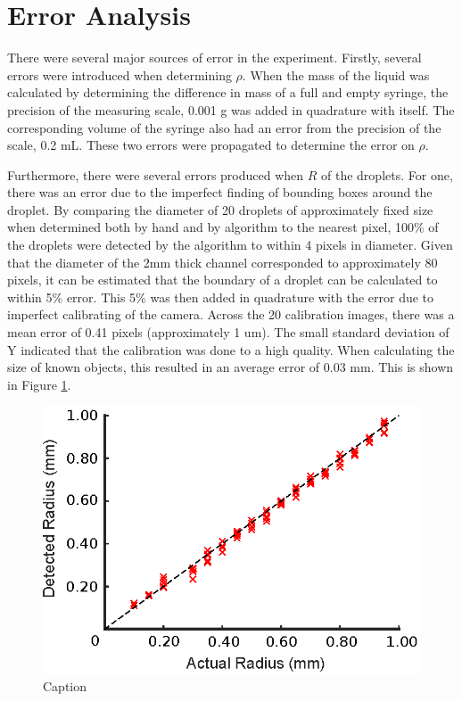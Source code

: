 \documentclass{physics_article_B}
\begin{document}
\section{Error Analysis} 
    
    There were several major sources of error in the experiment. Firstly, several errors were introduced when determining $\rho$. When the mass of the liquid was calculated by determining the difference in mass of a full and empty syringe, the precision of the measuring scale, 0.001 g was added in quadrature with itself. The corresponding volume of the syringe also had an error from the precision of the scale, 0.2 mL. These two errors were propagated to determine the error on $\rho$.
    
    Furthermore, there were several errors produced when $R$ of the droplets. For one, there was an error due to the imperfect finding of bounding boxes around the droplet. By comparing the diameter of 20 droplets of approximately fixed size when determined both by hand and by algorithm to the nearest pixel, 100\% of the droplets were detected by the algorithm to within 4 pixels in diameter. Given that the diameter of the 2mm thick channel corresponded to approximately 80 pixels, it can be estimated that the boundary of a droplet can be calculated to within 5\% error. This 5\% was then added in quadrature with the error due to imperfect calibrating of the camera. Across the 20 calibration images, there was a mean error of 0.41 pixels (approximately 1 um). The small standard deviation of Y indicated that the calibration was done to a high quality. When calculating the size of known objects, this resulted in an average error of 0.03 mm. This is shown in Figure \ref{fig:calib:error}. 
        
            \begin{figure}[H]
                \centering
                \hspace*{-1cm}\includegraphics{Figures/CameraCalib.eps}
                \caption{Caption}
                \label{fig:calib:error}
            \end{figure}
    
\end{document}
